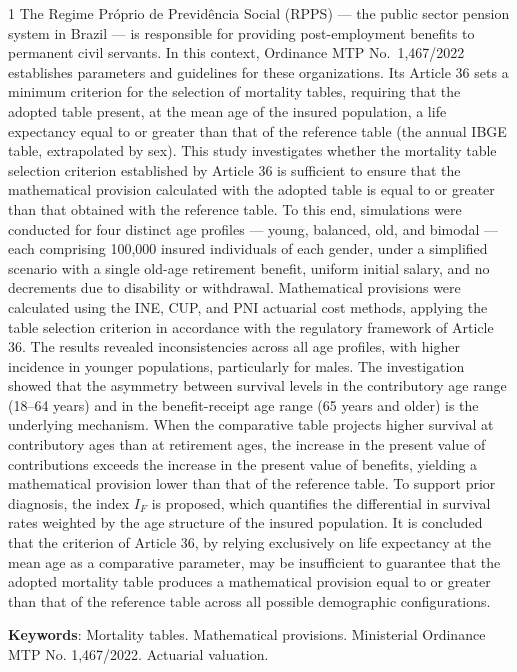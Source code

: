 \begin{spacing}{1}
    \noindent The Regime Próprio de Previdência Social (RPPS) — the public sector pension  system in Brazil — is responsible for providing post-employment benefits to  permanent civil servants. In this context, Ordinance MTP No.\ 1,467/2022  establishes parameters and guidelines for these organizations. Its Article 36  sets a minimum criterion for the selection of mortality tables, requiring that  the adopted table present, at the mean age of the insured population, a life  expectancy equal to or greater than that of the reference table (the annual  IBGE table, extrapolated by sex). This study investigates whether the mortality  table selection criterion established by Article 36 is sufficient to ensure that  the mathematical provision calculated with the adopted table is equal to or  greater than that obtained with the reference table. To this end, simulations  were conducted for four distinct age profiles --- young, balanced, old, and  bimodal --- each comprising 100,000 insured individuals of each gender, under a simplified  scenario with a single old-age retirement benefit, uniform initial salary, and  no decrements due to disability or withdrawal. Mathematical provisions were  calculated using the INE, CUP, and PNI actuarial cost methods, applying the  table selection criterion in accordance with the regulatory framework of  Article 36. The results revealed inconsistencies across all age profiles, with  higher incidence in younger populations, particularly for males. The  investigation showed that the asymmetry between survival levels in the  contributory age range (18--64 years) and in the benefit-receipt age range  (65 years and older) is the underlying mechanism. When the comparative table  projects higher survival at contributory ages than at retirement ages, the  increase in the present value of contributions exceeds the increase in the  present value of benefits, yielding a mathematical provision lower than that  of the reference table. To support prior diagnosis, the index $I_F$ is  proposed, which quantifies the differential in survival rates weighted by the  age structure of the insured population. It is concluded that the criterion of  Article 36, by relying exclusively on life expectancy at the mean age as a  comparative parameter, may be insufficient to guarantee that the adopted  mortality table produces a mathematical provision equal to or greater than that  of the reference table across all possible demographic configurations.
\end{spacing}
\vspace{1.0cm}

\noindent \textbf{Keywords}: Mortality tables. Mathematical provisions. Ministerial Ordinance MTP No. 1,467/2022. Actuarial valuation.